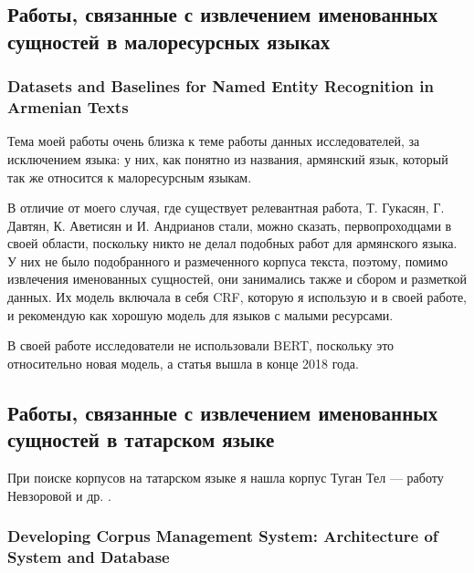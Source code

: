 \subsection{Работы, связанные с извлечением именованных сущностей в малоресурсных языках}

\subsubsection{Datasets and Baselines for Named Entity Recognition in Armenian Texts}

Тема моей работы очень близка к теме работы данных исследователей, за исключением языка: у них, как понятно из названия, армянский язык, который так же относится к малоресурсным языкам.

В отличие от моего случая, где существует релевантная работа, Т. Гукасян, Г. Давтян, К. Аветисян и И. Андрианов стали, можно сказать, первопроходцами в своей области, поскольку никто не делал подобных работ для армянского языка. У них не было подобранного и размеченного корпуса текста, поэтому, помимо извлечения именованных сущностей, они занимались также и сбором и разметкой данных. Их модель включала в себя CRF, которую я использую и в своей работе, и рекомендую как хорошую модель для языков с малыми ресурсами.

В своей работе исследователи не использовали BERT, поскольку это относительно новая модель, а статья вышла в конце 2018 года.


\subsection{Работы, связанные с извлечением именованных сущностей в татарском языке}

При поиске корпусов на татарском языке я нашла корпус Туган Тел --- работу Невзоровой и др. \cite{tugan_tel}. %

\subsubsection{Developing Corpus Management System:
Architecture of System and Database}

